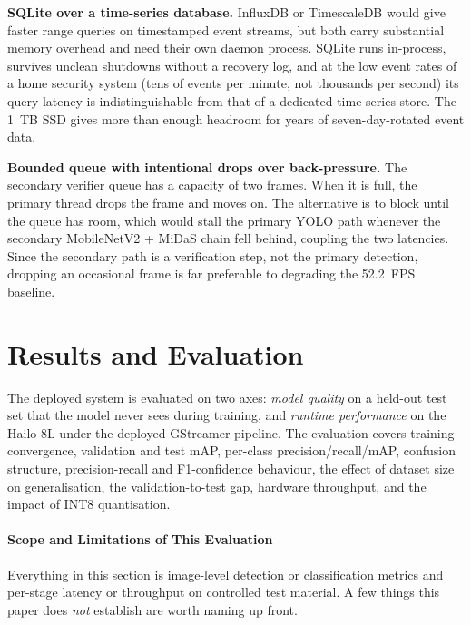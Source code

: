 \documentclass{ieeeaccess}
\begin{document}
\textbf{SQLite over a time-series database.} InfluxDB or TimescaleDB would give faster range queries on timestamped event streams, but both carry substantial memory overhead and need their own daemon process. SQLite runs in-process, survives unclean shutdowns without a recovery log, and at the low event rates of a home security system (tens of events per minute, not thousands per second) its query latency is indistinguishable from that of a dedicated time-series store. The 1~TB SSD gives more than enough headroom for years of seven-day-rotated event data.

\textbf{Bounded queue with intentional drops over back-pressure.} The secondary verifier queue has a capacity of two frames. When it is full, the primary thread drops the frame and moves on. The alternative is to block until the queue has room, which would stall the primary YOLO path whenever the secondary MobileNetV2 + MiDaS chain fell behind, coupling the two latencies. Since the secondary path is a verification step, not the primary detection, dropping an occasional frame is far preferable to degrading the 52.2~FPS baseline.


\section{Results and Evaluation}
\label{sec:results}
The deployed system is evaluated on two axes: \textit{model quality} on a held-out test set that the model never sees during training, and \textit{runtime performance} on the Hailo-8L under the deployed GStreamer pipeline. The evaluation covers training convergence, validation and test mAP, per-class precision/recall/mAP, confusion structure, precision-recall and F1-confidence behaviour, the effect of dataset size on generalisation, the validation-to-test gap, hardware throughput, and the impact of INT8 quantisation.

\paragraph*{Scope and Limitations of This Evaluation}
Everything in this section is image-level detection or classification metrics and per-stage latency or throughput on controlled test material. A few things this paper does \emph{not} establish are worth naming up front.
\end{document}
